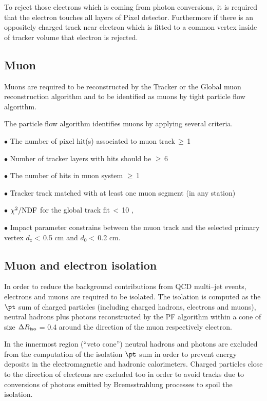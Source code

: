 To reject those electrons which is coming from photon conversions, it is required that the electron touches all layers of Pixel detector. Furthermore if there is an oppositely charged track near electron which is fitted to a common vertex inside of tracker volume that electron is rejected.  
\subsection{Muon}
Muons are required to be reconstructed by the Tracker or the Global muon reconstruction algorithm and to be identified as 
muons by tight particle flow algorithm.

The particle flow algorithm identifies  muons by applying several criteria.

$\bullet$ The number of pixel hit(s) associated to muon track\,$\geq $\,1

$\bullet$ Number of tracker layers with hits should be $\geq $\,6

$\bullet$ The number of hits in muon system $\geq $\,1

$\bullet$ Tracker track matched with at least one muon segment (in any station)

$\bullet$ $\chi ^{2}/{\rm NDF} $ for the global track fit\,$< $\,10 ,

$\bullet$ Impact parameter constrains between the muon track and the selected primary vertex 
 $d_{z} < $\,0.5 cm and $d_{0} <$\,0.2 cm.

\subsection{Muon and electron isolation}

In order to reduce the background contributions from QCD multi–jet events, electrons and
muons are required to be isolated. The isolation is computed as the $\pt$ sum of charged particles (including charged hadrons, 
electrons and muons), neutral hadrons plus photons reconstructed by the PF algorithm within a cone of size
$\Delta R_{\rm iso}$ = 0.4 around the direction of the muon respectively electron. 

In the innermost region
(``veto cone'') neutral
hadrons and photons  are excluded from the computation of the isolation $\pt$ sum in order to prevent energy deposits in the electromagnetic and hadronic calorimeters. Charged particles close to the direction of electrons  are excluded too in order to avoid tracks due to conversions of photons emitted by Bremsstrahlung processes to spoil the isolation.

